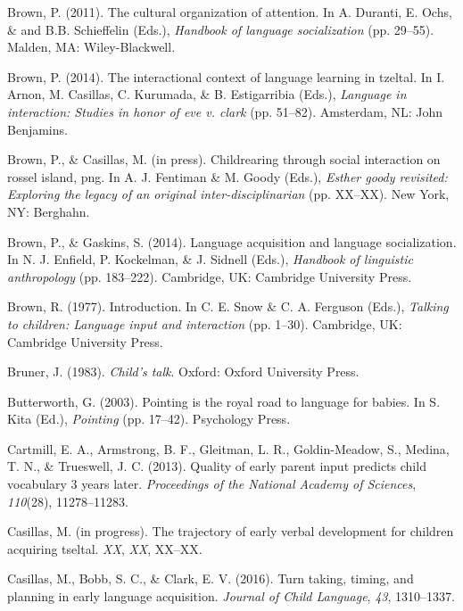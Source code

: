 \documentclass[floatsintext,man]{apa6}
\theoremstyle{definition}
\theoremstyle{definition}
\theoremstyle{definition}
\theoremstyle{remark}
\begin{document}
\hypertarget{ref-brown2011cultural}{}
Brown, P. (2011). The cultural organization of attention. In A. Duranti,
E. Ochs, \& and B.B. Schieffelin (Eds.), \emph{Handbook of language
socialization} (pp. 29--55). Malden, MA: Wiley-Blackwell.

\hypertarget{ref-brown2014interactional}{}
Brown, P. (2014). The interactional context of language learning in
tzeltal. In I. Arnon, M. Casillas, C. Kurumada, \& B. Estigarribia
(Eds.), \emph{Language in interaction: Studies in honor of eve v. clark}
(pp. 51--82). Amsterdam, NL: John Benjamins.

\hypertarget{ref-brownIPchildrearing}{}
Brown, P., \& Casillas, M. (in press). Childrearing through social
interaction on rossel island, png. In A. J. Fentiman \& M. Goody (Eds.),
\emph{Esther goody revisited: Exploring the legacy of an original
inter-disciplinarian} (pp. XX--XX). New York, NY: Berghahn.

\hypertarget{ref-brown2014language}{}
Brown, P., \& Gaskins, S. (2014). Language acquisition and language
socialization. In N. J. Enfield, P. Kockelman, \& J. Sidnell (Eds.),
\emph{Handbook of linguistic anthropology} (pp. 183--222). Cambridge,
UK: Cambridge University Press.

\hypertarget{ref-brown1997introduction}{}
Brown, R. (1977). Introduction. In C. E. Snow \& C. A. Ferguson (Eds.),
\emph{Talking to children: Language input and interaction} (pp. 1--30).
Cambridge, UK: Cambridge University Press.

\hypertarget{ref-bruner1983childs}{}
Bruner, J. (1983). \emph{Child's talk}. Oxford: Oxford University Press.

\hypertarget{ref-butterworth2003pointing}{}
Butterworth, G. (2003). Pointing is the royal road to language for
babies. In S. Kita (Ed.), \emph{Pointing} (pp. 17--42). Psychology
Press.

\hypertarget{ref-cartmill2013quality}{}
Cartmill, E. A., Armstrong, B. F., Gleitman, L. R., Goldin-Meadow, S.,
Medina, T. N., \& Trueswell, J. C. (2013). Quality of early parent input
predicts child vocabulary 3 years later. \emph{Proceedings of the
National Academy of Sciences}, \emph{110}(28), 11278--11283.

\hypertarget{ref-casillasIPtrajectory}{}
Casillas, M. (in progress). The trajectory of early verbal development
for children acquiring tseltal. \emph{XX}, \emph{XX}, XX--XX.

\hypertarget{ref-casillas2016turn}{}
Casillas, M., Bobb, S. C., \& Clark, E. V. (2016). Turn taking, timing,
and planning in early language acquisition. \emph{Journal of Child
Language}, \emph{43}, 1310--1337.
\end{document}
